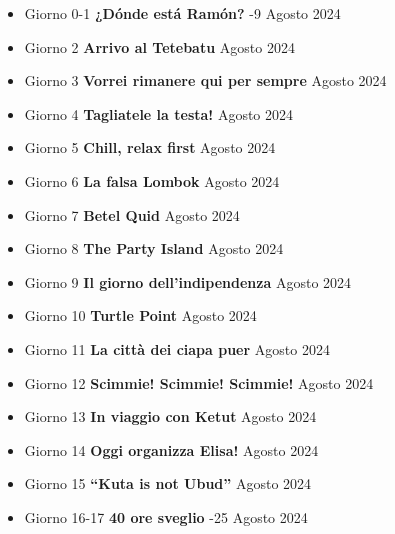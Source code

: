 \vspace{1.5cm}

\renewcommand{\labelitemi}{\tiny \textbullet}

\noindent
\begin{itemize}
    \setlength{\itemsep}{0.4cm}
    
    \item Giorno 0-1 \quad \textbf{¿Dónde está Ramón?} -9 Agosto 2024
    
    \item Giorno 2 \quad \textbf{Arrivo al Tetebatu}  Agosto 2024
    
    \item Giorno 3 \quad \textbf{Vorrei rimanere qui per sempre}  Agosto 2024
    
    \item Giorno 4 \quad \textbf{Tagliatele la testa!}  Agosto 2024
    
    \item Giorno 5 \quad \textbf{Chill, relax first}  Agosto 2024
    
    \item Giorno 6 \quad \textbf{La falsa Lombok}  Agosto 2024
    
    \item Giorno 7 \quad \textbf{Betel Quid}  Agosto 2024
    
    \item Giorno 8 \quad \textbf{The Party Island}  Agosto 2024
    
    \item Giorno 9 \quad \textbf{Il giorno dell'indipendenza}  Agosto 2024
    
    \item Giorno 10 \quad \textbf{Turtle Point}  Agosto 2024
    
    \item Giorno 11 \quad \textbf{La città dei ciapa puer}  Agosto 2024
    
    \item Giorno 12 \quad \textbf{Scimmie! Scimmie! Scimmie!}  Agosto 2024
    
    \item Giorno 13 \quad \textbf{In viaggio con Ketut}  Agosto 2024
    
    \item Giorno 14 \quad \textbf{Oggi organizza Elisa!}  Agosto 2024
    
    \item Giorno 15 \quad \textbf{``Kuta is not Ubud''}  Agosto 2024
    
    \item Giorno 16-17 \quad \textbf{40 ore sveglio} -25 Agosto 2024
    
\end{itemize}

\vfill
\newpage
\thispagestyle{empty}
\mbox{}
\newpage
